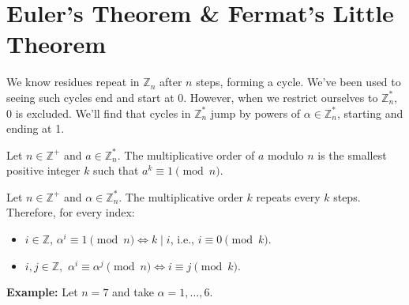 \section{Euler's Theorem \& Fermat's Little Theorem}

\noindent
We know residues repeat in $\mathbb{Z}_n$ after $n$ steps, forming a cycle. We've been used to seeing
such cycles end and start at $0$. However, when we restrict ourselves to $\mathbb{Z}_n^*$, 0 is excluded. We'll find that 
cycles in $\mathbb{Z}_n^*$ jump by powers of $\alpha\in\mathbb{Z}_n^*$, starting and ending at 1.\\
\begin{Def}
    
    Let $n\in\mathbb{Z^+}$ and $a\in\mathbb{Z}_n^*$. The multiplicative order of $a$ modulo $n$ is the smallest positive integer $k$ such that $a^k\equiv 1\pmod{n}$.
\end{Def}

\newpage
\begin{theo}

    \label{theo:mult_order_interval}

    Let $n\in\mathbb{Z^+}$ and $\alpha\in\mathbb{Z}_n^*$. The multiplicative order $k$ repeats every $k$ steps.
    Therefore, for every index:
    \begin{itemize}
        \item $i\in\mathbb{Z}$, $\alpha^i\equiv 1 \pmod{n}\Longleftrightarrow k\mid i$, i.e., $i\equiv 0\pmod{k}$.
        \item $i,j\in\mathbb{Z},$ $\alpha^i\equiv\alpha^j\pmod{n}\Longleftrightarrow i \equiv j\pmod{k}$.
    \end{itemize}
     
\end{theo}

\textbf{Example:} Let $n=7$ and take $\alpha=1,\dots,6$.\\

